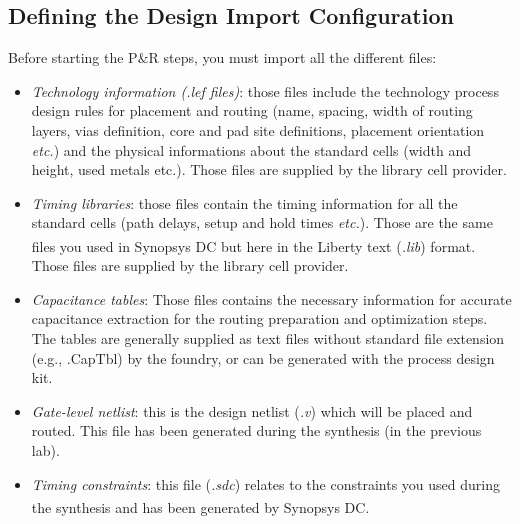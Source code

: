 \subsection{Defining the Design Import Configuration}
Before starting the P$\&$R steps, you must import all the different files:
\begin{itemize}
	\item \textit{Technology information (\textit{.lef} files)}: those files include the technology process design rules for placement and routing (name, spacing, width of routing layers, vias definition, core and pad site definitions, placement orientation \textit{etc.}) and the physical informations about the standard cells (width and height, used metals etc.). Those files are supplied by the library cell provider.
	\item \textit{Timing libraries}: those files contain the timing information for all the standard cells (path delays, setup and hold times \textit{etc.}). Those are the same files you used in Synopsys DC\textsuperscript{\tiny\textregistered} but here in the Liberty text (\textit{.lib}) format. Those files are supplied by the library cell provider.
	\item \textit{Capacitance tables}: Those files contains the necessary information for accurate capacitance extraction for the routing preparation and optimization steps. The tables are generally supplied as text files without standard file extension (e.g., .CapTbl) by the foundry, or can be generated with the process design kit.
	\item \textit{Gate-level netlist}: this is the design netlist (\textit{.v}) which will be placed and routed. This file has been generated during the synthesis (in the previous lab).
	\item \textit{Timing constraints}: this file (\textit{.sdc}) relates to the constraints you used during the synthesis and has been generated by Synopsys DC\textsuperscript{\tiny\textregistered}.
\end{itemize}


